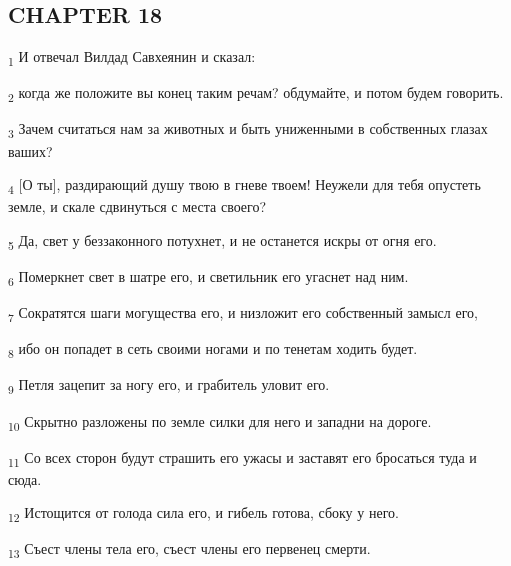 \subsection{CHAPTER 18}
\begin{tcolorbox}
\textsubscript{1} И отвечал Вилдад Савхеянин и сказал:
\end{tcolorbox}
\begin{tcolorbox}
\textsubscript{2} когда же положите вы конец таким речам? обдумайте, и потом будем говорить.
\end{tcolorbox}
\begin{tcolorbox}
\textsubscript{3} Зачем считаться нам за животных и быть униженными в собственных глазах ваших?
\end{tcolorbox}
\begin{tcolorbox}
\textsubscript{4} [О ты], раздирающий душу твою в гневе твоем! Неужели для тебя опустеть земле, и скале сдвинуться с места своего?
\end{tcolorbox}
\begin{tcolorbox}
\textsubscript{5} Да, свет у беззаконного потухнет, и не останется искры от огня его.
\end{tcolorbox}
\begin{tcolorbox}
\textsubscript{6} Померкнет свет в шатре его, и светильник его угаснет над ним.
\end{tcolorbox}
\begin{tcolorbox}
\textsubscript{7} Сократятся шаги могущества его, и низложит его собственный замысл его,
\end{tcolorbox}
\begin{tcolorbox}
\textsubscript{8} ибо он попадет в сеть своими ногами и по тенетам ходить будет.
\end{tcolorbox}
\begin{tcolorbox}
\textsubscript{9} Петля зацепит за ногу его, и грабитель уловит его.
\end{tcolorbox}
\begin{tcolorbox}
\textsubscript{10} Скрытно разложены по земле силки для него и западни на дороге.
\end{tcolorbox}
\begin{tcolorbox}
\textsubscript{11} Со всех сторон будут страшить его ужасы и заставят его бросаться туда и сюда.
\end{tcolorbox}
\begin{tcolorbox}
\textsubscript{12} Истощится от голода сила его, и гибель готова, сбоку у него.
\end{tcolorbox}
\begin{tcolorbox}
\textsubscript{13} Съест члены тела его, съест члены его первенец смерти.
\end{tcolorbox}
